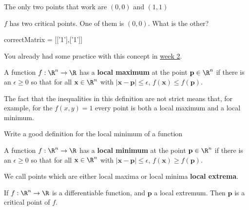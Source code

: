 \documentclass{ximera}
\begin{document}
\begin{question}
\begin{solution}
			\begin{hint}
				The only two points that work are $(0,0)$ and $(1,1)$
			\end{hint}
			$f$ has two critical points.  One of them is $(0,0)$.  What is the other?
			\begin{matrix-answer}
				correctMatrix = [['1'],['1']]
			\end{matrix-answer}
		\end{solution}
	\end{question}
	
	You already had some practice with this concept in \href{http://ximera.osu.edu/course/kisonecat/m2o2c2/course/activity/week2/practice/stationary-points/}{week 2}.
	
	\begin{definition}
		A function $f:\R^n \to \R$ has a \textbf{local maximum} at the point $\mathbf{p} \in \R^n$ if there is an $\epsilon \geq 0$ so that for all $\mathbf{x} \in \R^n$
		with $|\mathbf{x} - \mathbf{p}| \leq \epsilon$, $f(\mathbf{x}) \leq f(\mathbf{p})$.
	\end{definition}
	
	\begin{warning}
		The fact that the inequalities in this definition are not strict means that, for example, for the $f(x,y) = 1$ every point is both a local maximum and a local minimum.
	\end{warning}
	
	Write a good definition for the local minimum of a function
	\begin{free-response}
		A function $f:\R^n \to \R$ has a \textbf{local minimum} at the point $\mathbf{p} \in \R^n$ if there is an $\epsilon \geq 0$ so that for all $\mathbf{x} \in \R^n$
		with $|\mathbf{x} - \mathbf{p}| \leq \epsilon$, $f(\mathbf{x}) \geq f(\mathbf{p})$.
	\end{free-response}
		
	We call points which are either local maxima or local minima \textbf{local extrema}.
		
	\begin{theorem}
		If $f:\R^n \to \R$ is a differentiable function, and $\mathbf{p}$ a local extremum.  Then $\mathbf{p}$ is a critical point of $f$.
	\end{theorem}
	
\end{document}
